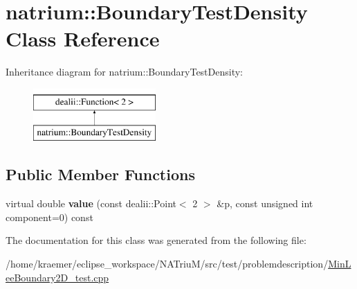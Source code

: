\hypertarget{classnatrium_1_1BoundaryTestDensity}{\section{natrium\-:\-:Boundary\-Test\-Density Class Reference}
\label{classnatrium_1_1BoundaryTestDensity}
}
Inheritance diagram for natrium\-:\-:Boundary\-Test\-Density\-:\begin{figure}[H]
\begin{center}
\leavevmode
\includegraphics[height=2.000000cm]{classnatrium_1_1BoundaryTestDensity}
\end{center}
\end{figure}
\subsection*{Public Member Functions}
\begin{DoxyCompactItemize}
\item 
\hypertarget{classnatrium_1_1BoundaryTestDensity_ac8f81b9f57f28653b6dbb180ac4a1527}{virtual double {\bfseries value} (const dealii\-::\-Point$<$ 2 $>$ \&p, const unsigned int component=0) const }\label{classnatrium_1_1BoundaryTestDensity_ac8f81b9f57f28653b6dbb180ac4a1527}

\end{DoxyCompactItemize}


The documentation for this class was generated from the following file\-:\begin{DoxyCompactItemize}
\item 
/home/kraemer/eclipse\-\_\-workspace/\-N\-A\-Triu\-M/src/test/problemdescription/\hyperlink{MinLeeBoundary2D__test_8cpp}{Min\-Lee\-Boundary2\-D\-\_\-test.\-cpp}\end{DoxyCompactItemize}

